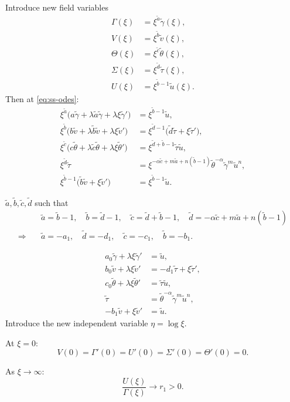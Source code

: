 \documentclass[a4paper,11pt]{article}
\def\tg{{\tilde{\gamma}}}
\def\tv{{\tilde{v}}}
\def\tth{{\tilde{\theta}}}
\def\ts{{\tilde{\tau}}}
\def\tu{{\tilde{u}}}
\def\ta{{\tilde{a}}}
\def\tb{{\tilde{b}}}
\def\tc{{\tilde{c}}}
\def\td{{\tilde{d}}}
\begin{document}
Introduce new field variables 
\begin{equation}
\begin{aligned}
 \Gamma(\xi) &= \xi^\ta \tg(\xi),\\
 V(\xi)&=\xi^\tb \tv(\xi),\\
 \Theta(\xi)&=\xi^\tc \tth(\xi),\\
 \Sigma(\xi)&=\xi^\td \ts(\xi),\\
 U(\xi)&=\xi^{\tb-1} \tu(\xi). 
\end{aligned}
\end{equation}
Then at \eqref{eq:ss-odes}:
\begin{align*}
 \xi^\ta\Big( a\tg + \lambda \ta \tg + \lambda\xi\tg'\Big) &=\xi^{\tb-1} \tu,\\
 \xi^\tb\Big( b\tv + \lambda \tb \tv + \lambda\xi\tv'\Big) &=\xi^{\td-1} \Big(\td\ts + \xi\ts'\Big),\\
 \xi^\tc\Big( c\tth+ \lambda \tc \tth+ \lambda\xi\tth'\Big)&=\xi^{\td+\tb-1} \ts\tu,\\
 \xi^\td\ts &= \xi^{-\alpha \tc +m\ta +n(\tb-1)} \tth^{-\alpha} \tg^m \tu^n,\\
 \xi^{\tb-1}\Big(\tb\tv + \xi \tv'\Big)&= \xi^{\tb-1} \tu.
\end{align*}

$\ta, \tb, \tc, \td$ such that
\begin{align*}
 &\ta=\tb-1, \quad \tb=\td-1, \quad \tc=\td+\tb-1,\quad \td = -\alpha \tc + m\ta +n(\tb-1) \\
 \Longrightarrow \quad&\ta = -a_1, \quad \td = -d_1, \quad \tc = -c_1, \quad \tb=-b_1.
\end{align*}

\begin{equation}
 \begin{aligned}
  a_0\tg + \lambda\xi\tg' &=\tu,\\
  b_0\tv + \lambda\xi\tv' &=-d_1 \ts + \xi\ts',\\
  c_0\tth+ \lambda\xi\tth'&=\ts\tu,\\
  \ts &=\tth^{-\alpha}\tg^m\tu^n,\\
  -b_1\tv+\xi\tv' &= \tu.
 \end{aligned}
\end{equation}
Introduce the new independent variable $\eta = \log\xi$.

At $\xi=0$:
$$V(0)=\Gamma'(0)=U'(0)=\Sigma'(0)=\Theta'(0)=0.$$

As $\xi \rightarrow \infty$:
$$ \frac{U(\xi)}{\Gamma(\xi)} \rightarrow r_1 >0.$$
\pagebreak
\end{document}
